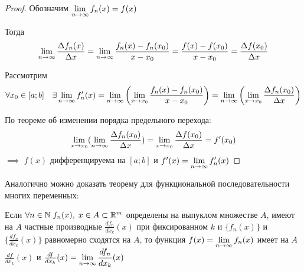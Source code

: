 \begin{proof}
    Обозначим $\displaystyle\lim_{n \to \infty} f_n(x) = f(x)$

    Тогда
    \[
        \displaystyle\lim_{n \to \infty} \frac{\Delta f_n(x)}{\Delta x}
        = \displaystyle\lim_{n \to \infty} \frac{f_n(x) - f_n(x_0)}{x - x_0}
        = \frac{f(x) - f(x_0)}{x - x_0} = \frac{\Delta f(x_0)}{\Delta x}
    \]

    Рассмотрим 
    \[
        \forall x_0 \in [a; b] \quad \exists \displaystyle\lim_{n \to \infty} f_n'(x)
        = \displaystyle\lim_{n \to \infty} \left( \displaystyle\lim_{x \to x_0} \frac{f_n(x) - f_n(x_0)}{x - x_0} \right)
        = \displaystyle\lim_{n \to \infty} \left( \displaystyle\lim_{x \to x_0} \frac{\Delta f_n(x_0)}{\Delta x} \right)
    \]

    По теореме об изменении порядка предельного перехода:
    \[
        \displaystyle\lim_{x \to x_0} (\displaystyle\lim_{n \to \infty} \frac{\Delta f_n(x_0)}{\Delta x})
        = \displaystyle\lim_{x \to x_0} \frac{\Delta f(x_0)}{\Delta x} = f'(x_0)
    \]
    $\implies$ $f(x)$ дифференцируема на $[a; b]$ и $f'(x) = \displaystyle\lim_{n \to \infty} f_n'(x)$
\end{proof}

\begin{remark}
    Аналогично можно доказать теорему для функциональной последовательности
    многих переменных:

    Если $\forall n \in \mathbb{N} \; f_n(x), \; x \in A \subset \mathbb{R}^m$ определены на
    выпуклом множестве $A$, имеют на $A$ частные производные 
    $\frac{d f_n}{d x_k} (x)$ при фиксированном $k$ и
    $\{ f_n(x) \}$ и $\{ \frac{d f_n}{d x_k} (x) \}$ равномерно сходятся на
    $A$, то функция $f(x) = \displaystyle\lim_{n \to \infty} f_n(x)$ имеет на $A \;$ 
    $\frac{df}{dx_k} (x)$ 
    и $\frac{df}{dx_k} (x) = \displaystyle\lim_{n \to \infty} \frac{df_n}{dx_k} (x)$ 
\end{remark}
